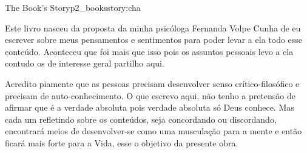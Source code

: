 

\begin{chapterpage}{The Book's Story}{p2_booksstory:cha}

Este livro nasceu da proposta da minha psicóloga Fernanda Volpe Cunha de eu escrever sobre meus pensamentos e sentimentos para poder levar a ela todo esse conteúdo. Aconteceu que foi mais que isso pois os assuntos pessoais levo a ela contudo os de interesse geral partilho aqui.

Acredito piamente que as pessoas precisam desenvolver senso crítico-filosófico e precisam de auto-conhecimento. O que escrevo aqui, não tenho a pretensão de afirmar que é a verdade absoluta pois verdade absoluta só Deus conhece. Mas cada um refletindo sobre os conteúdos, seja concordando ou discordando, encontrará meios de desenvolver-se como uma musculação para a mente e então ficará mais forte para a Vida, esse o objetivo da presente obra.

\end{chapterpage}




